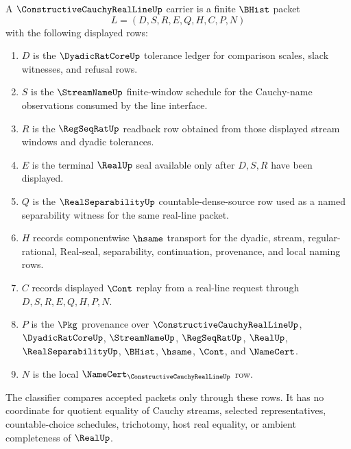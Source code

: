 \begin{definition}
\label{def:constructive-cauchy-real-line-carrier}
A $\ConstructiveCauchyRealLineUp$ carrier is a finite $\BHist$ packet
$$
L=(D,S,R,E,Q,H,C,P,N)
$$
with the following displayed rows:
\begin{enumerate}
\item $D$ is the $\DyadicRatCoreUp$ tolerance ledger for comparison scales, slack witnesses, and refusal rows.
\item $S$ is the $\StreamNameUp$ finite-window schedule for the Cauchy-name observations consumed by the line interface.
\item $R$ is the $\RegSeqRatUp$ readback row obtained from those displayed stream windows and dyadic tolerances.
\item $E$ is the terminal $\RealUp$ seal available only after $D,S,R$ have been displayed.
\item $Q$ is the $\RealSeparabilityUp$ countable-dense-source row used as a named separability witness for the same real-line packet.
\item $H$ records componentwise $\hsame$ transport for the dyadic, stream, regular-rational, Real-seal, separability, continuation, provenance, and local naming rows.
\item $C$ records displayed $\Cont$ replay from a real-line request through $D,S,R,E,Q,H,P,N$.
\item $P$ is the $\Pkg$ provenance over $\ConstructiveCauchyRealLineUp$, $\DyadicRatCoreUp$, $\StreamNameUp$, $\RegSeqRatUp$, $\RealUp$, $\RealSeparabilityUp$, $\BHist$, $\hsame$, $\Cont$, and $\NameCert$.
\item $N$ is the local $\NameCert_{\ConstructiveCauchyRealLineUp}$ row.
\end{enumerate}
The classifier compares accepted packets only through these rows. It has no coordinate for quotient equality of Cauchy streams, selected representatives, countable-choice schedules, trichotomy, host real equality, or ambient completeness of $\RealUp$.
\end{definition}

